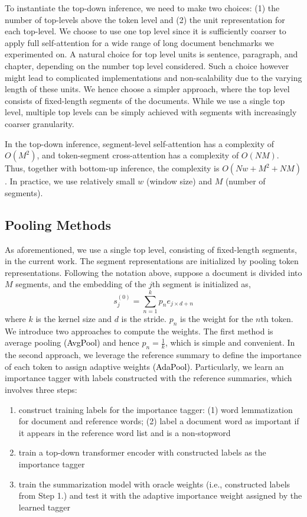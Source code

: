 \documentclass{article} \usepackage{iclr2022_conference,times}
\begin{document}
To instantiate the top-down inference, we need to make two choices: (1) the number of top-levels above the token level and (2) the unit representation for each top-level. We choose to use one top level since it is sufficiently coarser to apply full self-attention for a wide range of long document benchmarks we experimented on. A natural choice for top level units is sentence, paragraph, and chapter, depending on the number top level considered. Such a choice however might lead to complicated implementations and non-scalability due to the varying length of these units. We hence choose a simpler approach, where the top level consists of fixed-length segments of the documents. While we use a single top level, multiple top levels can be simply achieved with segments with increasingly coarser granularity. 


In the top-down inference, segment-level self-attention has a complexity of $O(M^2)$, and token-segment cross-attention has a complexity of $O(NM)$. Thus, together with bottom-up inference, the complexity is $O(Nw + M^2 + NM)$. In practice, we use relatively small $w$ (window size) and $M$ (number of segments).









\subsection{Pooling Methods}
\label{sec:pooling}
As aforementioned, we use a single top level, consisting of fixed-length segments, in the current work. The segment representations are initialized by pooling token representations. Following the notation above, suppose a document is divided into $M$ segments, and the embedding of the $j$th segment is initialized as,
\begin{equation}
    s_j^{(0)} = \sum_{n=1}^k p_n e_{j \times d + n}
\end{equation}
where $k$ is the kernel size and $d$ is the stride. $p_n$ is the weight for the $n$th token. We introduce two approaches to compute the weights. The first method is average pooling \textcolor{black}{(AvgPool)} and hence $p_n = \frac{1}{k}$, which is simple and convenient. In the second approach, we leverage the reference summary to define the importance of each token to assign adaptive weights \textcolor{black}{(AdaPool)}. Particularly, we learn an importance tagger with labels constructed with the reference summaries, which involves three steps:
\begin{enumerate}
    \item construct training labels for the importance tagger: (1) word lemmatization for document and reference words; (2) label a document word as important if it appears in the reference word list and is a non-stopword
    \item train a top-down transformer encoder with constructed labels as the importance tagger
    \item train the summarization model with oracle weights (i.e., constructed labels from Step 1.) and test it with the adaptive importance weight assigned by the learned tagger
\end{enumerate}
\end{document}
